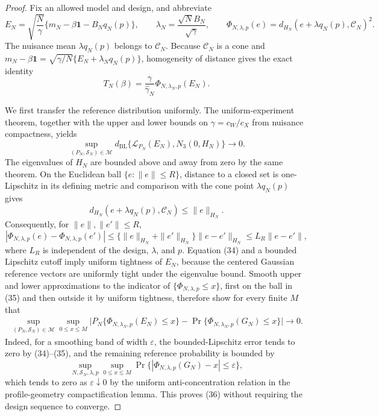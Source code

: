 \documentclass{article}
\begin{document}
\begin{proof}
Fix an allowed model and design, and abbreviate
\[
E_N=\sqrt{\frac N\gamma}\{m_N-\beta\mathbf1-B_Nq_N(p)\},
\qquad
\lambda_N=\frac{\sqrt N B_N}{\sqrt\gamma},
\qquad
\Phi_{N,\lambda,p}(e)
=d_{H_N}(e+\lambda q_N(p),\mathcal C_N)^2.                                   \tag{32}
\]
The nuisance mean \(\lambda q_N(p)\) belongs to \(\mathcal C_N\).  Because \(\mathcal C_N\) is a cone and \(m_N-\beta\mathbf1=\sqrt{\gamma/N}\{E_N+\lambda_Nq_N(p)\}\), homogeneity of distance gives the exact identity
\[
T_N(\beta)
=\frac{\gamma}{\widehat\gamma_N}
 \Phi_{N,\lambda_N,p}(E_N).                                                   \tag{33}
\]

We first transfer the reference distribution uniformly.  The uniform-experiment theorem, together with the upper and lower bounds on \(\gamma=c_W/c_X\) from nuisance compactness, yields
\[
\sup_{(P_N,\mathcal S_N)\in\mathcal M}
d_{\mathrm{BL}}\{\mathcal L_{P_N}(E_N),N_3(0,H_N)\}\longrightarrow0.        \tag{34}
\]
The eigenvalues of \(H_N\) are bounded above and away from zero by the same theorem.  On the Euclidean ball \(\{e:\|e\|\le R\}\), distance to a closed set is one-Lipschitz in its defining metric and comparison with the cone point \(\lambda q_N(p)\) gives
\[
d_{H_N}(e+\lambda q_N(p),\mathcal C_N)\le\|e\|_{H_N}.
\]
Consequently, for \(\|e\|,\|e'\|\le R\),
\[
|\Phi_{N,\lambda,p}(e)-\Phi_{N,\lambda,p}(e')|
\le \{\|e\|_{H_N}+\|e'\|_{H_N}\}\|e-e'\|_{H_N}
\le L_R\|e-e'\|,                                                            \tag{35}
\]
where \(L_R\) is independent of the design, \(\lambda\), and \(p\).  Equation (34) and a bounded Lipschitz cutoff imply uniform tightness of \(E_N\), because the centered Gaussian reference vectors are uniformly tight under the eigenvalue bound.  Smooth upper and lower approximations to the indicator of \(\{\Phi_{N,\lambda,p}\le x\}\), first on the ball in (35) and then outside it by uniform tightness, therefore show for every finite \(M\) that
\[
\begin{split}
\sup_{(P_N,\mathcal S_N)\in\mathcal M}\sup_{0\le x\le M}
\big|P_N\{\Phi_{N,\lambda_N,p}(E_N)\le x\}
{}-{}\Pr\{\Phi_{N,\lambda_N,p}(G_N)\le x\}\big|\longrightarrow0.          \tag{36}
\end{split}
\]
Indeed, for a smoothing band of width \(\varepsilon\), the bounded-Lipschitz error tends to zero by (34)--(35), and the remaining reference probability is bounded by
\[
\sup_{N,\mathcal S_N,\lambda,p}\sup_{0\le x\le M}
\Pr\{|\Phi_{N,\lambda,p}(G_N)-x|\le\varepsilon\},
\]
which tends to zero as \(\varepsilon\downarrow0\) by the uniform anti-concentration relation in the profile-geometry compactification lemma.  This proves (36) without requiring the design sequence to converge.


\end{proof}
\end{document}
